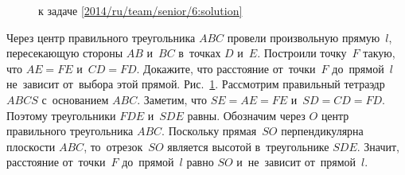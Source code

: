 \ifsolution
\begin{figure}\centering
    \caption{к задаче \ref{2014/ru/team/senior/6:solution}}
    \label{2014/ru/team/senior/6:solution:fig}
\end{figure}%
\fi %

\problem{}
Через центр правильного треугольника $ABC$ провели произвольную прямую~$l$,
пересекающую стороны $AB$ и~$BC$ в~точках $D$ и~$E$.
Построили точку~$F$ такую, что $AE = FE$ и~$CD = FD$.
Докажите, что расстояние от~точки~$F$ до~прямой~$l$ не~зависит от~выбора этой
прямой.
\solution
\label{2014/ru/team/senior/6:solution}%
Рис.~\ref{2014/ru/team/senior/6:solution:fig}.
Рассмотрим правильный тетраэдр $ABCS$ с~основанием $ABC$.
Заметим, что $SE = AE = FE$ и~$SD = CD = FD$.
Поэтому треугольники $FDE$ и~$SDE$ равны.
Обозначим через $O$ центр правильного треугольника $ABC$.
Поскольку прямая~$SO$ перпендикулярна плоскости $ABC$, то~отрезок~$SO$ является
высотой в~треугольнике $SDE$.
Значит, расстояние от~точки~$F$ до~прямой~$l$ равно $SO$ и~не~зависит
от~прямой~$l$.
\endproblem

